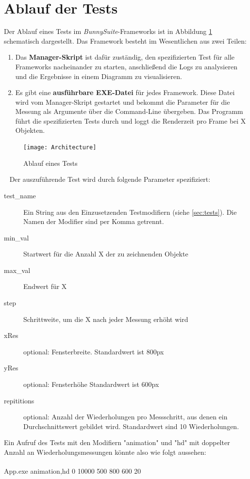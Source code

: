 \section{Ablauf der Tests}
Der Ablauf eines Tests im \textit{BunnySuite}-Frameworks ist in Abbildung \ref{dia:architecture} schematisch dargestellt. Das Framework besteht im Wesentlichen aus zwei Teilen:
\begin{enumerate}
\item Das \textbf{Manager-Skript} ist dafür zuständig, den spezifizierten Test für alle Frameworks nacheinander zu starten, anschließend die Logs zu analysieren und die Ergebnisse in einem Diagramm zu visualisieren.
\item Es gibt eine \textbf{ausführbare EXE-Datei} für jedes Framework. Diese Datei wird vom Manager-Skript gestartet und bekommt die Parameter für die Messung als Argumente über die Command-Line übergeben. Das Programm führt die spezifizierten Tests durch und loggt die Renderzeit pro Frame bei X Objekten.
\end{enumerate}
\begin{figure}[h]
\caption{Ablauf eines Tests}
\centering
\texttt{[image: Architecture]}
\label{dia:architecture}
\end{figure}
~\newpage
Der auszuführende Test wird durch folgende Parameter spezifiziert:\\
\begin{description}
\item[test\_name] Ein String aus den Einzusetzenden Testmodifiern (siehe \ref{sec:tests}). Die Namen der Modifier sind per Komma getrennt.
\item[min\_val] Startwert für die Anzahl X der zu zeichnenden Objekte
\item[max\_val] Endwert für X
\item[step] Schrittweite, um die X nach jeder Messung erhöht wird
\item[xRes] optional: Fensterbreite. Standardwert ist 800px
\item[yRes] optional: Fensterhöhe Standardwert ist 600px
\item[repititions] optional: Anzahl der Wiederholungen pro Messschritt, aus denen ein Durchschnittswert gebildet wird. Standardwert sind 10 Wiederholungen.
\end{description}
Ein Aufruf des Tests mit den Modifiern "animation" und "hd" mit doppelter Anzahl an Wiederholungsmessungen könnte also wie folgt aussehen:\\\\
App.exe animation,hd 0 10000 500 800 600 20

